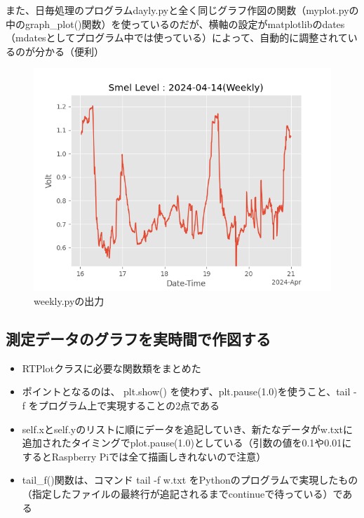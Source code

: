 \documentclass[12pt,a4paper,uplatex]{jsarticle}
\begin{document}
また、日毎処理のプログラムdayly.pyと全く同じグラフ作図の関数（myplot.pyの中のgraph\_plot()関数）を使っているのだが、横軸の設定がmatplotlibのdates（mdatesとしてプログラム中では使っている）によって、自動的に調整されているのが分かる（便利）

\begin{figure}[htbp]
	\begin{minipage}[b]{1.0\linewidth}
		\centering
		\includegraphics[keepaspectratio, scale=0.8]{figs/png/Weekly_2024-04-14.png}
		\caption{weekly.pyの出力}
	\end{minipage}
\end{figure}


\subsection{測定データのグラフを実時間で作図する}

\begin{itemize}
	\item RTPlotクラスに必要な関数類をまとめた
	\item ポイントとなるのは、 plt.show() を使わず、plt.pause(1.0)を使うこと、tail -f をプログラム上で実現することの2点である
	\item self.xとself.yのリストに順にデータを追記していき、新たなデータがw.txtに追加されたタイミングでplot.pause(1.0)としている（引数の値を0.1や0.01にするとRaspberry Piでは全て描画しきれないので注意）
	\item tail\_f()関数は、コマンド tail -f w.txt をPythonのプログラムで実現したもの（指定したファイルの最終行が追記されるまでcontinueで待っている）である
\end{itemize}
\end{document}
